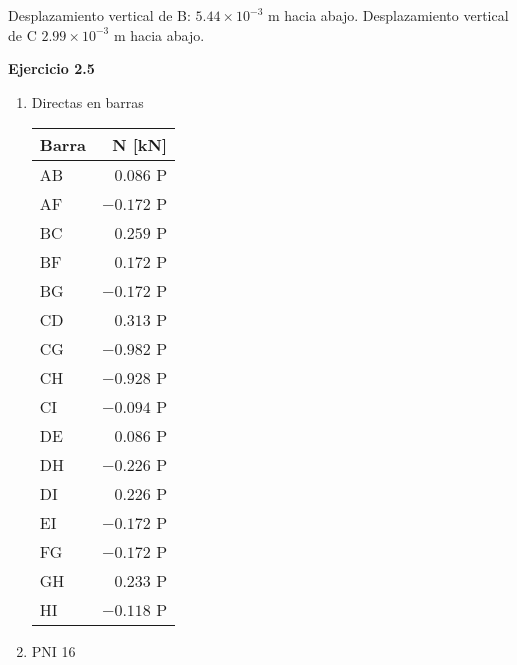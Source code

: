 Desplazamiento vertical de B: $5.44 \times 10^{-3}$ m hacia abajo. Desplazamiento vertical de C $ 2.99 \times 10^{-3}$ m hacia abajo.\newline


\textbf{Ejercicio 2.5}\\

\begin{enumerate}[label=\alph*)]
	\item
Directas en barras

\begin{center}
	\begin{tabular}{lr}
		\hline
		Barra & N [kN] \\
		\hline
AB & $0.086$ P \\
AF & $-0.172$ P \\
BC & $0.259$ P \\
BF & $0.172$ P \\
BG & $-0.172$ P \\
CD & $0.313$ P \\
CG & $-0.982$ P \\
CH & $-0.928$ P \\
CI & $-0.094$ P \\
DE & $0.086$ P \\
DH & $-0.226$ P \\
DI & $0.226$ P \\
EI & $-0.172$ P \\
FG & $-0.172$ P \\
GH & $0.233$ P \\
HI & $-0.118$ P \\
\hline
\end{tabular}
\end{center}

\item PNI 16
\end{enumerate}





